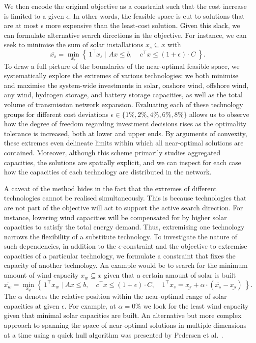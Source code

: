 We then encode the original objective as a constraint 
such that the cost increase is limited to a given $\epsilon$.
In other words, the feasible space is cut to solutions that
are at most $\epsilon$ more expensive than the least-cost solution.
Given this slack, we can formulate alternative search directions in the objective.
For instance, we can seek to minimise the sum of solar installations $x_s \subseteq x$ with
\begin{equation}
    \overline{x_s} = \min_{x_s}\left\{\: 1^\top x_s \mid Ax\leq b,\quad c^\top x\leq (1+\epsilon)\cdot C \:\right\}.
\end{equation}
To draw a full picture of the boundaries of the near-optimal feasible space, 
we systematically explore the extremes of various technologies:
we both minimise and maximise the system-wide investments in
solar, onshore wind, offshore wind, any wind, hydrogen storage, and battery storage
capacities, as well as the total volume of transmission network expansion.
Evaluating each of these technology groups for
different cost deviations $\epsilon \in \{1\%,2\%,4\%,6\%,8\%\}$
allows us to observe how the degree of freedom regarding investment decisions
rises as the optimality tolerance is increased, both at lower and upper ends.
By arguments of convexity, these extremes even delineate limits
within which all near-optimal solutions are contained.
Moreover, although this scheme primarily studies aggregated capacities,
the solutions are spatially explicit, and we can inspect for each case
how the capacities of each technology are distributed in the network.


A caveat of the method hides in the fact that the extremes
of different technologies cannot be realised simultaneously.
This is because technologies that are not part of the objective
will act to support the active search direction.
For instance, lowering wind capacities will be compensated for
by higher solar capacities to satisfy the total energy demand.
Thus, extremising one technology narrows the flexibility of a substitute technology.
To investigate the nature of such dependencies,
in addition to the $\epsilon$-constraint and the objective to
extremise capacities of a particular technology,
we formulate a constraint that fixes the capacity of another technology.
An example would be to search for the minimum amount of wind capacity $x_w \subseteq x$ 
given that a certain amount of solar is built
\begin{equation}
    \overline{x_w} = \min_{x_w}\left\{\:1^\top x_w \mid Ax\leq b,\quad c^\top x\leq (1+\epsilon)\cdot C, \quad 1^\top x_s = \underline{x_s} + \alpha \cdot (\overline{x_s}-\underline{x_s}) \:\right\}.
\end{equation}
The $\alpha$ denotes the relative position within the near-optimal
range of solar capacities at given $\epsilon$.
For example, at $\alpha=0\%$ we look for the least wind capacity
given that minimal solar capacities are built. 
An alternative but more complex approach to spanning the space of near-optimal solutions in multiple dimensions at a time
using a quick hull algorithm was presented by Pedersen et al.~\cite{pedersen_modeling_2020}.

